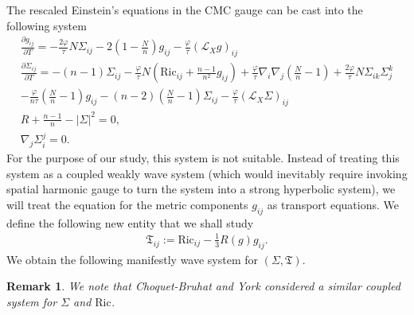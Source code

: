 \documentclass{amsart}
\newtheorem{remark}{Remark}
\begin{document}
\noindent The rescaled Einstein's equations in the CMC gauge can be cast into the following system
\begin{align}
\label{eq:cmc1}
 \frac{\partial g_{ij}}{\partial T}=-\frac{2\varphi}{\tau}N\Sigma_{ij}-2(1-\frac{N}{n})g_{ij}-\frac{\varphi}{\tau}(\mathscr{L}_{X}g)_{ij}\\
 \frac{\partial \Sigma_{ij}}{\partial T}=-(n-1)\Sigma_{ij}-\frac{\varphi}{\tau}N(\text{Ric}_{ij}+\frac{n-1}{n^{2}}g_{ij})+\frac{\varphi}{\tau}\nabla_{i}\nabla_{j}(\frac{N}{n}-1)+\frac{2\varphi}{\tau}N\Sigma_{ik}\Sigma^{k}_{j}\\
 -\frac{\varphi}{n\tau}(\frac{N}{n}-1)g_{ij}-(n-2)(\frac{N}{n}-1)\Sigma_{ij}-\frac{\varphi}{\tau}(\mathscr{L}_{X}\Sigma)_{ij}\\
 \label{eq:HC11}
 R+\frac{n-1}{n}-|\Sigma|^{2}=0,\\
 \label{eq:cmc2}
 \nabla_{j}\Sigma^{j}_{i}=0.
\end{align}
For the purpose of our study, this system is not suitable. Instead of treating this system as a coupled weakly wave system (which would inevitably require invoking spatial harmonic gauge to turn the system into a strong hyperbolic system), we will treat the equation for the metric components $g_{ij}$ as transport equations. We define the following new entity that we shall study 
\begin{align}
    \mathfrak{T}_{ij}:=\text{Ric}_{ij}-\frac{1}{3}R(g)g_{ij}.
\end{align}
We obtain the following manifestly wave system for $(\Sigma,\mathfrak{T})$.
\begin{remark}
 We note that Choquet-Bruhat and York \cite{YCBY} considered a similar coupled system for $\Sigma$ and $\text{Ric}$.
\end{remark}
\end{document}
